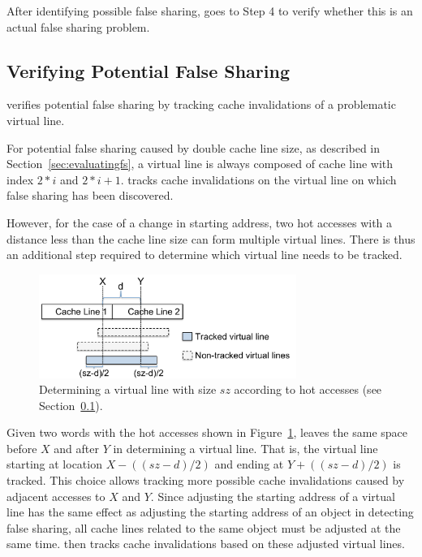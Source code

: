 After identifying possible false sharing, \Predator{} goes to Step 4 to 
verify whether this is an actual false sharing problem.

\subsection{Verifying Potential False Sharing}
\label{sec:tracking}

\Predator{} verifies potential false sharing by tracking 
cache invalidations of a problematic virtual line.

For potential false sharing caused by double cache line size, as described in
Section~\ref{sec:evaluatingfs}, a virtual line is always composed of 
cache line with index $2*i$ and $2*i+1$. 
\Predator{} tracks cache invalidations
on the virtual line on which false sharing has been discovered.

However, for the case of a change in starting address,
two hot accesses with a distance less than the cache line size 
can form multiple virtual lines. 
There is thus an additional step required to determine which virtual line needs to be tracked.


\begin{figure}
\begin{center} 
\includegraphics[width=3.3in]{fig/trackpotential}
\end{center}
\caption{Determining a virtual line with size $sz$ according to hot accesses (see Section~\ref{sec:tracking}).
\label{fig:trackpotential}}
\end{figure}

Given two words with the hot accesses shown in Figure~\ref{fig:trackpotential}, 
\Predator{} leaves the same space before $X$ and after $Y$ in determining a virtual line. 
That is, the virtual line starting 
at location $X-((sz-d)/2)$ and ending at $Y+((sz-d)/2)$ is tracked. 
This choice allows tracking more possible cache invalidations caused by
adjacent accesses to $X$ and $Y$. 
Since adjusting the starting address of a virtual line has the same effect as
adjusting the starting address of an object in detecting false sharing,
all cache lines related to the same object must be adjusted at the same time.
\Predator{} then tracks cache invalidations based on these adjusted virtual lines.


